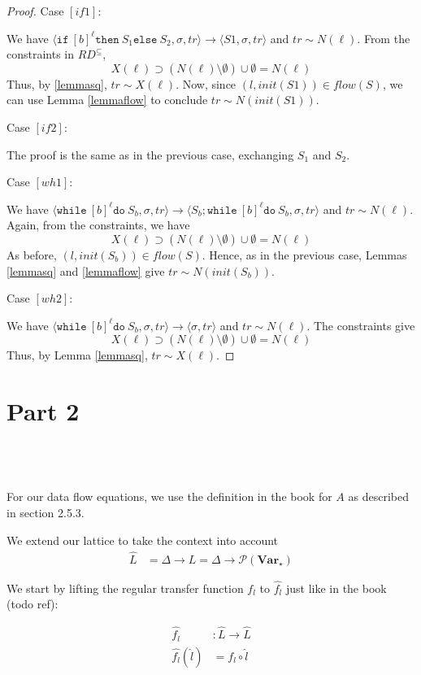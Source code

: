 \documentclass[a4wide,12pt]{article}
\theoremstyle{definition}
\theoremstyle{plain}
\theoremstyle{remark}
\def\pset#1{\mathcal{P}(#1)}
\def\const#1{\mathopen{\langle}#1\mathclose{\rangle}} %
\def\pair#1{\const{#1}}
\def\Var {\mathbf{Var}}
\def\whilel{\texttt{while}\ }
\def\dol {\texttt{do}\ }
\def\ifl {\texttt{if}\ }
\def\thenl {\texttt{then}\ }
\def\elsel {\texttt{else}\ }
\begin{document}
\begin{proof}
Case $[if1]$:

We have $\pair{\ifl [b]^\ell \thenl S_1 \elsel S_2,\sigma,tr} \to \pair{S1,\sigma,tr}$ and $tr \sim N(\ell)$.
From the constraints in $RD^{\subseteq}$, 
\[ X(\ell) \supset (N(\ell) \setminus \emptyset) \cup \emptyset = N(\ell)\]
Thus, by \ref{lemmasq}, $tr \sim X(\ell)$. Now, since $(l,init(S1)) \in flow(S)$, we can use Lemma \ref{lemmaflow}
to conclude $tr \sim N(init(S1))$.

Case $[if2]$:

The proof is the same as in the previous case, exchanging $S_1$ and $S_2$.

Case $[wh1]$:

We have $\pair{\whilel [b]^\ell \dol S_b,\sigma,tr} \to \pair{S_b;\whilel [b]^\ell \dol S_b,\sigma,tr}$ and $tr \sim N(\ell)$.
Again, from the constraints, we have
\[X(\ell) \supset (N(\ell) \setminus \emptyset) \cup \emptyset = N(\ell)\]
As before, $(l,init(S_b)) \in flow(S)$. Hence, as in the previous case, Lemmas \ref{lemmasq} and \ref{lemmaflow} give
$tr \sim N(init(S_b))$.

Case $[wh2]$:

We have $\pair{\whilel [b]^\ell \dol S_b,\sigma,tr} \to \pair{\sigma,tr}$ and $tr \sim N(\ell)$.
The constraints give
\[X(\ell) \supset (N(\ell) \setminus \emptyset) \cup \emptyset = N(\ell)\]
Thus, by Lemma \ref{lemmasq}, $tr \sim X(\ell)$.

\end{proof}
 
\section{Part 2}

\subsection{~}

For our data flow equations, we use the definition in the book for $A$ as
described in section 2.5.3.

We extend our lattice to take the context into account
\begin{align}
\widehat{L} & = \Delta \to L = \Delta \to \pset{\Var_\star}
\end{align}

We start by lifting the regular transfer function $f_l$ to $\widehat{f_l}$ just
like in the book (todo ref):

\begin{align}
\widehat{f_l} & : \widehat{L} \to \widehat {L} \\
\widehat{f_l} (\widehat{l}) & = f_l \circ \widehat{l}
\end{align}
\end{document}

